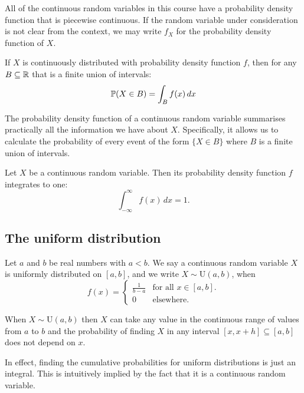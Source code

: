 \documentclass[10pt, a4paper]{article}
\begin{document}
All of the continuous random variables in this course have a probability density function that is piecewise continuous.
If the random variable under consideration is not clear from the context,
we may write $f_X$ for the probability density function of $X$.

\begin{theorem}
    If $X$ is continuously distributed with probability density function $f$,
    then for any $B \subseteq \R$ that is a finite union of intervals:
    \[
    \P(X \in B) = \int_Bf(x)\, dx
    \]
\end{theorem}
The probability density function of a continuous random variable summarises practically all the information we have about $X$.
Specifically, it allows us to calculate the probability of every event of the form $\{X \in B\}$ where $B$ is a finite union of intervals.

\begin{corollary}
    Let $X$ be a continuous random variable.
    Then its probability density function $f$ integrates to one:
    \[
    \int_{-\infty}^{\infty}f(x)\,dx = 1.
    \]
\end{corollary}

\subsection{The uniform distribution}
\begin{definition}
Let $a$ and $b$ be real numbers with $a < b$.
We say a continuous random variable $X$ is uniformly distributed on $[a, b]$,
and we write $X \sim \mathrm{U}(a, b)$,
when
\[
f(x) = \begin{cases}
    \frac{1}{b - a} & \text{for all } x \in [a, b]. \\
    0 & \text{elsewhere}.
\end{cases}
\]
\end{definition}

When $X \sim \mathrm{U}(a, b)$ then $X$ can take any value in the continuous range of values from $a$ to $b$ and the probability of finding $X$ in any interval $[x, x + h] \subseteq [a, b]$ does not depend on $x$.

In effect,
finding the cumulative probabilities for uniform distributions is just an integral.
This is intuitively implied by the fact that it is a continuous random variable.
\end{document}
